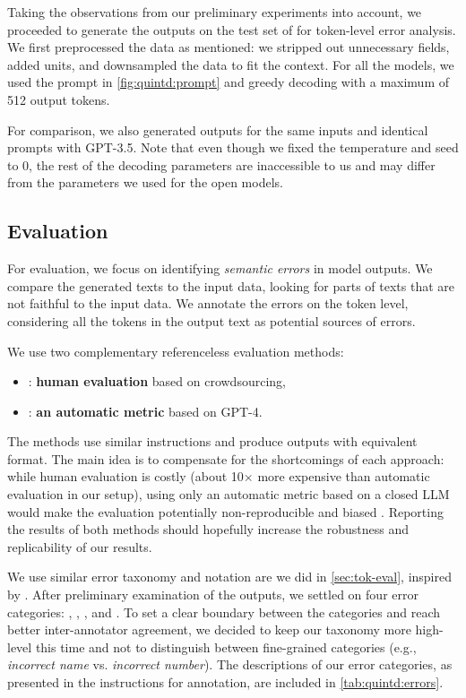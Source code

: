 Taking the observations from our preliminary experiments into account, we proceeded to generate the outputs on the test set of \benchmark{} for token-level error analysis. We first preprocessed the data as mentioned: we stripped out unnecessary fields, added units, and downsampled the data to fit the context. For all the models, we used the prompt in \autoref{fig:quintd:prompt} and greedy decoding with a maximum of 512 output tokens.

For comparison, we also generated outputs for the same inputs and identical prompts with GPT-3.5. Note that even though we fixed the temperature and seed to $0$, the rest of the decoding parameters are inaccessible to us and may differ from the parameters we used for the open models.


\subsection{Evaluation}
\label{sec:quintd:eval}
For evaluation, we focus on identifying \emph{semantic errors} in model outputs. We compare the generated texts to the input data, looking for parts of texts that are not faithful to the input data. We annotate the errors on the token level, considering all the tokens in the output text as potential sources of errors.


We use two complementary referenceless evaluation methods:
\begin{itemize}
    \item \humanmetric{}: \textbf{human evaluation} based on crowdsourcing,
    \item \gptmetric{}: \textbf{an automatic metric} based on GPT-4.
\end{itemize}

The methods use similar instructions and produce outputs with equivalent format. The main idea is to compensate for the shortcomings of each approach: while human evaluation is costly (about 10$\times$ more expensive than automatic evaluation in our setup), using only an automatic metric based on a closed LLM would make the evaluation potentially non-reproducible and biased \cite{kocmiGEMBAMQMDetectingTranslation2023,wangLargeLanguageModels2023}. Reporting the results of both methods should hopefully increase the robustness and replicability of our results.




We use similar error taxonomy and notation are we did in \autoref{sec:tok-eval}, inspired by \citet{thomsonGoldStandardMethodology2020}. After preliminary examination of the outputs, we settled on four error categories: , , , and . To set a clear boundary between the categories and reach better inter-annotator agreement, we decided to keep our taxonomy more high-level this time and not to distinguish between fine-grained categories (e.g., \textit{incorrect name} vs. \textit{incorrect number}). The descriptions of our error categories, as presented in the instructions for annotation, are included in \autoref{tab:quintd:errors}.

